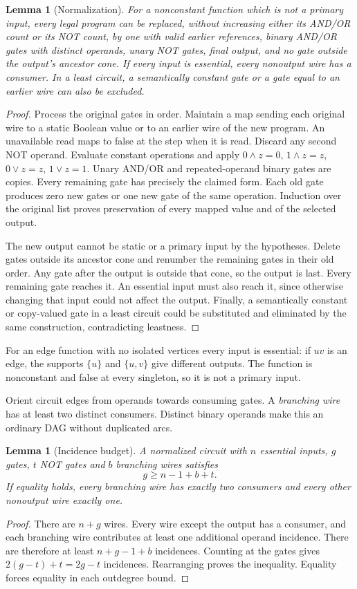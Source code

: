 \documentclass[11pt]{article}
\newcommand{\AND}{\mathbin{\wedge}}
\newcommand{\OR}{\mathbin{\vee}}
\newtheorem{lemma}[theorem]{Lemma}
\theoremstyle{definition}
\theoremstyle{remark}
\begin{document}
\begin{lemma}[Normalization]\label{lem:normalization}
For a nonconstant function which is not a primary input, every legal program
can be replaced, without increasing either its AND/OR count or its NOT
count, by one with valid earlier references, binary AND/OR gates with
distinct operands, unary NOT gates, final output, and no gate outside the
output's ancestor cone. If every input is essential, every nonoutput wire
has a consumer. In a least circuit, a semantically constant gate or a gate
equal to an earlier wire can also be excluded.
\end{lemma}
\begin{proof}
Process the original gates in order. Maintain a map sending each original
wire to a static Boolean value or to an earlier wire of the new program.
An unavailable read maps to false at the step when it is read. Discard any
second NOT operand. Evaluate constant operations and apply
$0\AND z=0$, $1\AND z=z$, $0\OR z=z$, $1\OR z=1$.
Unary AND/OR and repeated-operand binary gates are copies. Every remaining
gate has precisely the claimed form. Each old gate produces zero new gates
or one new gate of the same operation. Induction over the original list
proves preservation of every mapped value and of the selected output.

The new output cannot be static or a primary input by the hypotheses.
Delete gates outside its ancestor cone and renumber the remaining gates in
their old order. Any gate after the output is outside that cone, so the
output is last. Every remaining gate reaches it. An essential input must
also reach it, since otherwise changing that input could not affect the
output. Finally, a semantically constant or copy-valued gate in a least
circuit could be substituted and eliminated by the same construction,
contradicting leastness.
\end{proof}

For an edge function with no isolated vertices every input is essential:
if $uv$ is an edge, the supports $\{u\}$ and $\{u,v\}$ give different
outputs. The function is nonconstant and false at every singleton, so it
is not a primary input.

Orient circuit edges from operands towards consuming gates. A
\emph{branching wire} has at least two distinct consumers. Distinct binary
operands make this an ordinary DAG without duplicated arcs.

\begin{lemma}[Incidence budget]\label{lem:budget}
A normalized circuit with $n$ essential inputs, $g$ gates, $t$ NOT gates
and $b$ branching wires satisfies
\[
                  g\ge n-1+b+t.
\]
If equality holds, every branching wire has exactly two consumers and
every other nonoutput wire exactly one.
\end{lemma}
\begin{proof}
There are $n+g$ wires. Every wire except the output has a consumer, and each
branching wire contributes at least one additional operand incidence.
There are therefore at least $n+g-1+b$ incidences. Counting at the gates
gives $2(g-t)+t=2g-t$ incidences. Rearranging proves the inequality.
Equality forces equality in each outdegree bound.
\end{proof}
\end{document}
